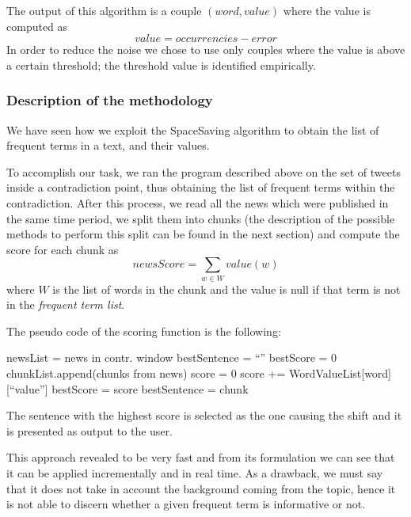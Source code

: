 The output of this algorithm is a couple $(word, value)$ where the value is
computed as 
\begin{displaymath}
	value = occurrencies - error
\end{displaymath}
In order to reduce the noise we chose to use only couples where the value is
above a certain threshold; the threshold value is identified empirically.

\subsubsection*{Description of the methodology}
We have seen how we exploit the SpaceSaving algorithm to obtain the list of
frequent terms in a text, and their values. 

To accomplish our task, we ran the program described above on the set of tweets inside a
contradiction point, thus obtaining the list of frequent terms within the
contradiction. After this process, we read all the news which were published in the same time
period, we split them into chunks (the description of the possible methods to
perform this split can be found in the next section) and compute the score for
each chunk as
\begin{displaymath}
	newsScore = \sum_{w \in W} value(w)
\end{displaymath}
where $W$ is the list of words in the chunk and the value is null if that term is
not in the \emph{frequent term list}.

The pseudo code of the scoring function is the following:
\begin{algorithmic}
\STATE newsList = news in contr. window
\STATE bestSentence = ``''
\STATE bestScore = 0
	\STATE chunkList.append(chunks from news)
\ENDFOR
{}
	\STATE score = 0
			\STATE score += WordValueList[word][``value'']
		\ELSE {}
			\STATE bestScore = score
			\STATE bestSentence = chunk
		\ENDIF \ENDIF
	\ENDFOR
\ENDFOR
\end{algorithmic}
The sentence with the highest score is selected as the one causing the shift and
it is presented as output to the user.

This approach revealed to be very fast and from its formulation we can see that
it can be applied incrementally and in real time. As a drawback, we must say that it does not
take in account the background coming from the topic, hence it is not able to
discern whether a given frequent term is informative or not.

